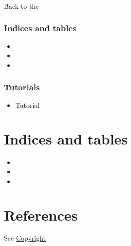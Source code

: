\documentclass[letterpaper,10pt,english]{sphinxmanual}
\begin{document}
Back to the {\hyperref[techDoc:technical-label]{\emph{}}}


\subsection{Indices and tables}
\label{techDoc:indices-and-tables}\begin{itemize}
\item {} 

\item {} 

\item {} 

\end{itemize}


\subsection{Tutorials}
\label{techDoc:tutorials}\begin{itemize}
\item {} 
Tutorial

\end{itemize}


\chapter{Indices and tables}
\label{index:indices-and-tables}\begin{itemize}
\item {} 

\item {} 

\item {} 

\end{itemize}


\chapter{References}
\label{index:references}
See \href{http://leopold-loewenheim.uni.lu/Digraph3/digraph3\_copyright.html}{Copyright}
\end{document}
